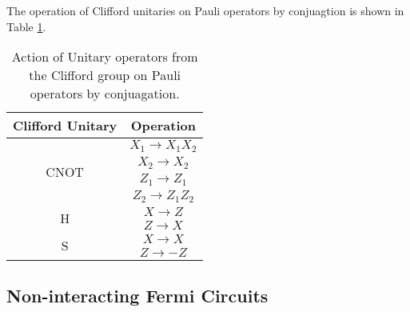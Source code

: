 The operation of Clifford unitaries on Pauli operators by conjuagtion is shown in Table \ref{table:1}.
\begin{table}[h!]
    \centering
    \begin{tabular}{ ||c|c|| }
        \hline
        Clifford Unitary              & Operation        \\
        \hline\hline
        \multirow{4}{3em}{CNOT} & $X_1 \to X_1X_2$ \\
                                & $X_2 \to X_2$    \\
                                & $Z_1 \to Z_1$    \\
                                & $Z_2 \to Z_1Z_2$ \\
        \hline
        \multirow{2}{1em}{H}    & $X \to Z$        \\
                                & $Z\to X$         \\
        \hline
        \multirow{2}{0.9em}{S}    & $X \to X$        \\
                                & $Z \to -Z$       \\
        \hline
    \end{tabular}
    \caption{Action of Unitary operators from the Clifford group on Pauli operators by conjuagation.}
    \label{table:1}
\end{table}


\subsection{Non-interacting Fermi Circuits}
